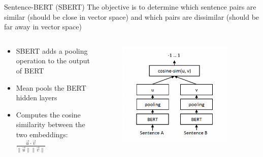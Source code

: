 \documentclass{beamer}
\begin{document}
\begin{frame}{Sentence-BERT (SBERT)\cite{sbert}}
  The objective is to determine which sentence pairs are similar (should be close in vector space) and which pairs are dissimilar (should be far away in vector space)
  \begin{columns}
    \begin{column}{0.4\textwidth}
     \begin{itemize}
      \item SBERT adds a pooling operation to the output of BERT
      \item Mean pools the BERT hidden layers
      \item Computes the cosine similarity between the two embeddings: $\frac{\vec{u} \cdot \vec{v}}{\|\vec{u}\|\|\vec{v}\|}$
     \end{itemize}
    \end{column}
    \begin{column}{0.6\textwidth}
        \begin{figure}[ht!]
          \centering
          \includegraphics[width=0.9\textwidth]{images/sbert_arch.png}
      \end{figure}     
    \end{column}
  \end{columns}
\end{frame}
\end{document}
